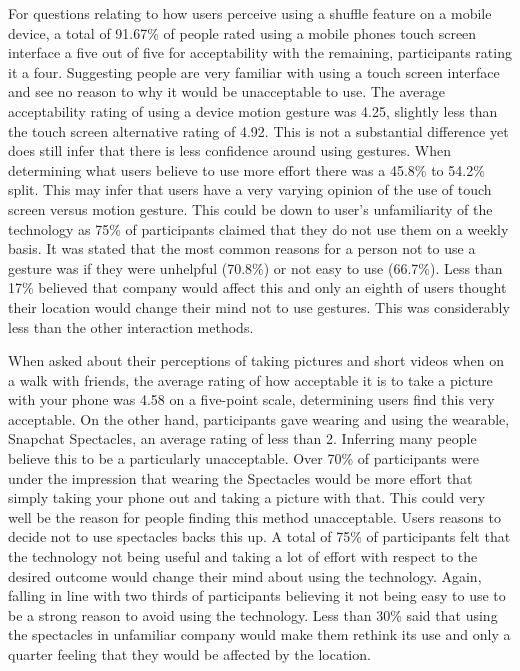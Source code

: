 \documentclass{l4proj}
\begin{document}
For questions relating to how users perceive using a shuffle feature on a mobile device, a total of 91.67\% of people rated using a mobile phones touch screen interface a five out of five for acceptability with the remaining, participants rating it a four. Suggesting people are very familiar with using a touch screen interface and see no reason to why it would be unacceptable to use. The average acceptability rating of using a device motion gesture was 4.25, slightly less than the touch screen alternative rating of 4.92. This is not a substantial difference yet does still infer that there is less confidence around using gestures. When determining what users believe to use more effort there was a 45.8\% to 54.2\% split. This may infer that users have a very varying opinion of the use of touch screen versus motion gesture. This could be down to user’s unfamiliarity of the technology as 75\% of participants claimed that they do not use them on a weekly basis. It was stated that the most common reasons for a person not to use a gesture was if they were unhelpful (70.8\%) or not easy to use (66.7\%). Less than 17\% believed that company would affect this and only an eighth of users thought their location would change their mind not to use gestures. This was considerably less than the other interaction methods.

When asked about their perceptions of taking pictures and short videos when on a walk with friends, the average rating of how acceptable it is to take a picture with your phone was 4.58 on a five-point scale, determining users find this very acceptable. On the other hand, participants gave wearing and using the wearable, Snapchat Spectacles, an average rating of less than 2. Inferring many people believe this to be a particularly unacceptable. Over 70\% of participants were under the impression that wearing the Spectacles would be more effort that simply taking your phone out and taking a picture with that. This could very well be the reason for people finding this method unacceptable. Users reasons to decide not to use spectacles backs this up. A total of 75\% of participants felt that the technology not being useful and taking a lot of effort with respect to the desired outcome would change their mind about using the technology. Again, falling in line with two thirds of participants believing it not being easy to use to be a strong reason to avoid using the technology. Less than 30\% said that using the spectacles in unfamiliar company would make them rethink its use and only a quarter feeling that they would be affected by the location. 
\end{document}
